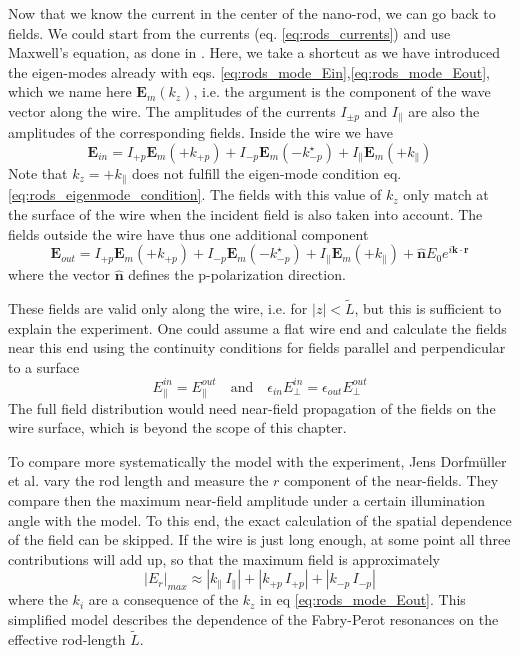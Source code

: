 Now that we know the current in the center of the nano-rod, we can go back to fields. We could start from the currents (eq. \ref{eq:rods_currents}) and use Maxwell's equation, as done in \cite{Dorfmueller10}. Here, we take a shortcut as we have introduced the eigen-modes already with eqs. \ref{eq:rods_mode_Ein},\ref{eq:rods_mode_Eout}, which we  name here $\mathbf{E}_m(k_z)$, i.e. the argument is the component of the wave vector along the wire. The amplitudes of the currents $I_{\pm p}$ and $I_\parallel$ are also the amplitudes of the corresponding fields. Inside the wire we have
\begin{equation}
  \mathbf{E}_{in} = I_{+p} \mathbf{E}_m (+ k_{+p}) +  I_{-p} \mathbf{E}_m ( - k_{-p}^\star) + I_{\parallel} \mathbf{E}_m ( + k_{\parallel})
\end{equation}
Note that $k_z = + k_{\parallel}$ does not fulfill the eigen-mode condition eq. \ref{eq:rods_eigenmode_condition}. The fields with this value of $k_z$ only match at the surface of the wire when the incident field is also taken into account. The fields outside the wire have thus one additional component
\begin{equation}
  \mathbf{E}_{out} = I_{+p} \mathbf{E}_m (+ k_{+p}) +  I_{-p} \mathbf{E}_m (- k_{-p}^\star) + I_{\parallel} \mathbf{E}_m ( + k_{\parallel}) + \mathbf{\hat{n}} E_0 e^{i \mathbf{k} \cdot \mathbf{r} }
\end{equation}
where the vector $\mathbf{\hat{n}}$ defines the p-polarization direction.  

These fields are valid only along the wire, i.e. for $|z| < \tilde{L}$, but this is sufficient to explain the experiment. One could assume a flat wire end and calculate the fields near this end using the continuity conditions for fields parallel and perpendicular to a surface
\begin{equation}
  E_\parallel^{in}  =  E_\parallel^{out} \quad \text{and} \quad 
  \epsilon_{in} E_\perp^{in}  =  \epsilon_{out}  E_\perp^{out}
\end{equation}
The full field distribution  would need near-field propagation of the fields on the wire surface, which is beyond the scope of this chapter.

To compare more systematically the model with the experiment, Jens Dorfmüller et al. vary the rod length and measure the $r$ component of the near-fields. They compare then the maximum near-field amplitude under a certain illumination angle with the model. To this end, the exact calculation of the spatial dependence of the field can be skipped. If the wire is just long enough, at some point all three contributions will add up, so that the maximum field is approximately
\begin{equation}
  | E_r |_{max} \approx | k_\parallel \, I_\parallel | + | k_{+p} \, I_{+p} | +  | k_{-p} \, I_{-p} | 
\end{equation}
where the $k_i$ are a consequence of the $k_z$ in eq \ref{eq:rods_mode_Eout}. This simplified model describes the dependence of the Fabry-Perot resonances on the effective rod-length $\tilde{L}$.





